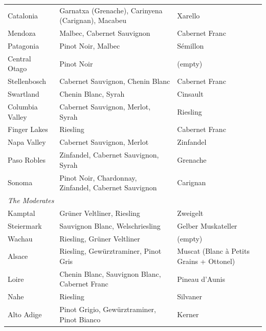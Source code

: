 \documentclass[11pt]{article}
\begin{document}
\begin{small}
\begin{longtable}{p{3.5cm} p{6cm} p{3cm}}
Catalonia            & Garnatxa (Grenache), Carinyena (Carignan), Macabeu           & Xarel\textperiodcentered{}lo \\
Mendoza              & Malbec, Cabernet Sauvignon                                   & Cabernet Franc \\
Patagonia            & Pinot Noir, Malbec                                           & S\'emillon \\
Central Otago        & Pinot Noir                                                   & (empty) \\
Stellenbosch         & Cabernet Sauvignon, Chenin Blanc                             & Cabernet Franc \\
Swartland            & Chenin Blanc, Syrah                                          & Cinsault \\
Columbia Valley      & Cabernet Sauvignon, Merlot, Syrah                            & Riesling \\
Finger Lakes         & Riesling                                                     & Cabernet Franc \\
Napa Valley          & Cabernet Sauvignon, Merlot                                   & Zinfandel \\
Paso Robles          & Zinfandel, Cabernet Sauvignon, Syrah                         & Grenache \\
Sonoma               & Pinot Noir, Chardonnay, Zinfandel, Cabernet Sauvignon        & Carignan \\
\midrule
\multicolumn{3}{l}{\textit{The Moderates}} \\
Kamptal              & Gr\"uner Veltliner, Riesling                                 & Zweigelt \\
Steiermark           & Sauvignon Blanc, Welschriesling                              & Gelber Muskateller \\
Wachau               & Riesling, Gr\"uner Veltliner                                 & (empty) \\
Alsace               & Riesling, Gewürztraminer, Pinot Gris                         & Muscat (Blanc à Petits Grains + Ottonel) \\
Loire                & Chenin Blanc, Sauvignon Blanc, Cabernet Franc                & Pineau d'Aunis \\
Nahe                 & Riesling                                                     & Silvaner \\
Alto Adige           & Pinot Grigio, Gewürztraminer, Pinot Bianco                   & Kerner \\

\end{longtable}
\end{small}
\end{document}

